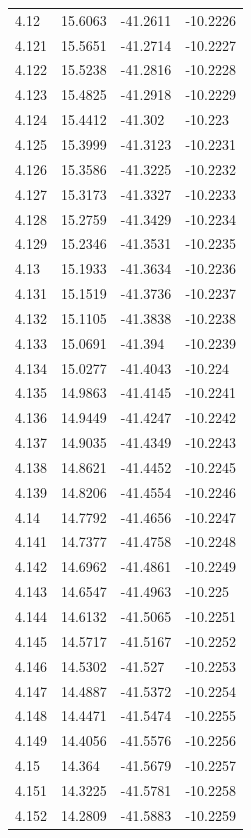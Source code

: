 \begin{tabular}{llll}
4.12 & 15.6063 & -41.2611 & -10.2226 \\
4.121 & 15.5651 & -41.2714 & -10.2227 \\
4.122 & 15.5238 & -41.2816 & -10.2228 \\
4.123 & 15.4825 & -41.2918 & -10.2229 \\
4.124 & 15.4412 & -41.302 & -10.223 \\
4.125 & 15.3999 & -41.3123 & -10.2231 \\
4.126 & 15.3586 & -41.3225 & -10.2232 \\
4.127 & 15.3173 & -41.3327 & -10.2233 \\
4.128 & 15.2759 & -41.3429 & -10.2234 \\
4.129 & 15.2346 & -41.3531 & -10.2235 \\
4.13 & 15.1933 & -41.3634 & -10.2236 \\
4.131 & 15.1519 & -41.3736 & -10.2237 \\
4.132 & 15.1105 & -41.3838 & -10.2238 \\
4.133 & 15.0691 & -41.394 & -10.2239 \\
4.134 & 15.0277 & -41.4043 & -10.224 \\
4.135 & 14.9863 & -41.4145 & -10.2241 \\
4.136 & 14.9449 & -41.4247 & -10.2242 \\
4.137 & 14.9035 & -41.4349 & -10.2243 \\
4.138 & 14.8621 & -41.4452 & -10.2245 \\
4.139 & 14.8206 & -41.4554 & -10.2246 \\
4.14 & 14.7792 & -41.4656 & -10.2247 \\
4.141 & 14.7377 & -41.4758 & -10.2248 \\
4.142 & 14.6962 & -41.4861 & -10.2249 \\
4.143 & 14.6547 & -41.4963 & -10.225 \\
4.144 & 14.6132 & -41.5065 & -10.2251 \\
4.145 & 14.5717 & -41.5167 & -10.2252 \\
4.146 & 14.5302 & -41.527 & -10.2253 \\
4.147 & 14.4887 & -41.5372 & -10.2254 \\
4.148 & 14.4471 & -41.5474 & -10.2255 \\
4.149 & 14.4056 & -41.5576 & -10.2256 \\
4.15 & 14.364 & -41.5679 & -10.2257 \\
4.151 & 14.3225 & -41.5781 & -10.2258 \\
4.152 & 14.2809 & -41.5883 & -10.2259 \\

\end{tabular}
